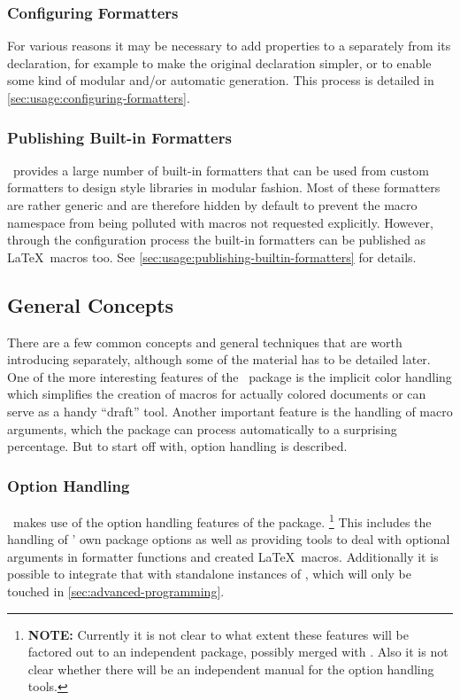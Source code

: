 \documentclass[12pt]{scrartcl}
\begin{document}
\subsubsection{Configuring Formatters}
\label{sec:intro-configuring-formatters}

For various reasons it may be necessary to add properties to a  separately from its declaration, for example to make the original declaration simpler, or to enable some kind of modular and/or automatic generation.  This process is detailed in \vref{sec:usage:configuring-formatters}.


\subsubsection{Publishing Built-in Formatters}
\label{sec:intro-publishing-builtin-formatters}

\luaformatters\ provides a large number of built-in formatters that can be used from custom formatters to design style libraries in modular fashion.  Most of these formatters are rather generic and are therefore hidden by default to prevent the macro namespace from being polluted with macros not requested explicitly.  However, through the configuration process the built-in formatters can be published as \LaTeX\ macros too.  See \vref{sec:usage:publishing-builtin-formatters} for details.

\subsection{General Concepts}
\label{sec:intro:general-concepts}

There are a few common concepts and general techniques that are worth introducing separately,
although some of the material has to be detailed later.  One of the more
interesting features of the \luaformatters\ package is the implicit color
handling which simplifies the creation of macros for actually colored documents
or can serve as a handy “draft” tool.  Another important feature is the handling
of macro arguments, which the package can process automatically to a surprising
percentage.  But to start off with, option handling is described.


\subsubsection{Option Handling}
\label{sec:option-handling}

\luaformatters\ makes use of the option handling features of the
 package.%
\footnote{\textbf{NOTE:} Currently it is not clear to what extent these features will
be factored out to an independent package, possibly merged with \luaformatters.
Also it is not clear whether there will be an independent manual for the option handling
tools.} %
This includes the handling of \luaformatters' own package options as
well as providing tools to deal with optional arguments in formatter functions
and created \LaTeX\ macros.  Additionally it is possible to integrate that with
standalone instances of , which will only be touched in
\vref{sec:advanced-programming}.
\end{document}
